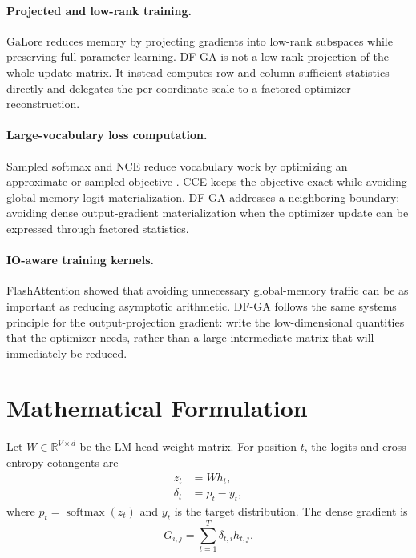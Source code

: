 \documentclass{article}
\begin{document}
\paragraph{Projected and low-rank training.}
GaLore \citep{zhao2024galore} reduces memory by projecting gradients into
low-rank subspaces while preserving full-parameter learning. DF-GA is not a
low-rank projection of the whole update matrix. It instead computes row and
column sufficient statistics directly and delegates the per-coordinate scale to
a factored optimizer reconstruction.

\paragraph{Large-vocabulary loss computation.}
Sampled softmax and NCE reduce vocabulary work by optimizing an approximate or
sampled objective \citep{gutmann2010noise, jean2015using}. CCE
\citep{wijmans2024cut} keeps the objective exact while avoiding global-memory
logit materialization. DF-GA addresses a neighboring boundary: avoiding dense
output-gradient materialization when the optimizer update can be expressed
through factored statistics.

\paragraph{IO-aware training kernels.}
FlashAttention \citep{dao2022flashattention} showed that avoiding unnecessary
global-memory traffic can be as important as reducing asymptotic arithmetic.
DF-GA follows the same systems principle for the output-projection gradient:
write the low-dimensional quantities that the optimizer needs, rather than a
large intermediate matrix that will immediately be reduced.

\section{Mathematical Formulation}

Let $W \in \mathbb{R}^{V \times d}$ be the LM-head weight matrix. For position
$t$, the logits and cross-entropy cotangents are
\begin{align}
  z_t &= W h_t, \\
  \delta_t &= p_t - y_t,
\end{align}
where $p_t = \operatorname{softmax}(z_t)$ and $y_t$ is the target distribution.
The dense gradient is
\begin{equation}
  G_{i,j} = \sum_{t=1}^T \delta_{t,i} h_{t,j}.
\end{equation}
\end{document}
